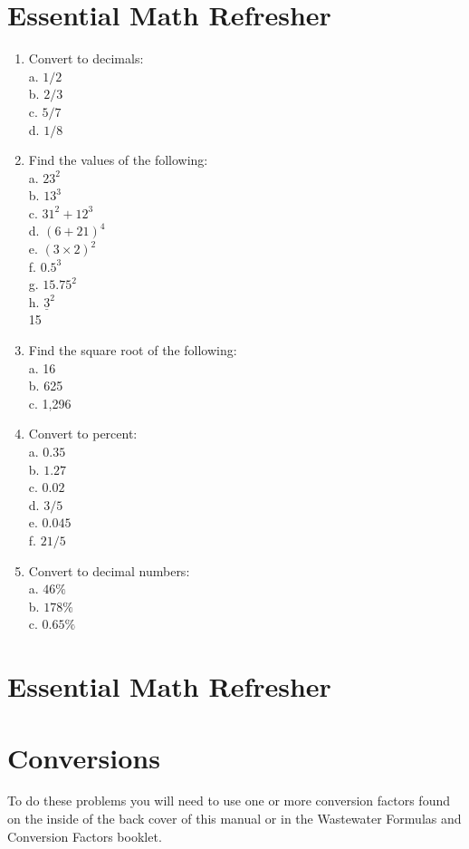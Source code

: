 \documentclass[10pt]{article}
\begin{document}
\section{Essential Math Refresher}
\begin{enumerate}
  \item Convert to decimals:\\
a. $1 / 2$\\
b. $2 / 3$\\
c. $5 / 7$\\
d. $1 / 8$

  \item Find the values of the following:\\
a. $23^{2}$\\
b. $13^{3}$\\
c. $31^{2}+12^{3}$\\
d. $(6+21)^{4}$\\
e. $(3 \times 2)^{2}$\\
f. $0.5^{3}$\\
g. $15.75^{2}$\\
h. $\underline{3}^{2}$\\
15

  \item Find the square root of the following:\\
a. 16\\
b. 625\\
c. 1,296

  \item Convert to percent:\\
a. $0.35$\\
b. $1.27$\\
c. $0.02$\\
d. $3 / 5$\\
e. $0.045$\\
f. $21 / 5$

  \item Convert to decimal numbers:\\
a. $46 \%$\\
b. $178 \%$\\
c. $0.65 \%$

\end{enumerate}
\section{Essential Math Refresher}
\section{Conversions}
To do these problems you will need to use one or more conversion factors found on the inside of the back cover of this manual or in the Wastewater Formulas and Conversion Factors booklet.
\end{document}
